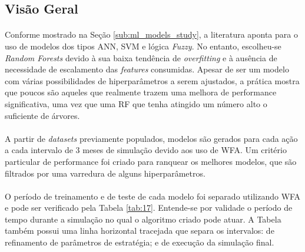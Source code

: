 \FloatBarrier
\subsection{Visão Geral}

\paragraph{} Conforme mostrado na Seção \ref{sub:ml_models_study}, a literatura aponta para o uso de modelos dos tipos ANN, SVM e lógica \textit{Fuzzy}. No entanto, escolheu-se \textit{Random Forests} devido à sua baixa tendência de \textit{overfitting} e à ausência de necessidade de escalamento das \textit{features} consumidas. Apesar de ser um modelo com várias possibilidades de hiperparâmetros a serem ajustados, a prática mostra que poucos são aqueles que realmente trazem uma melhora de performance significativa, uma vez que uma RF que tenha atingido um número alto o suficiente de árvores.

\paragraph{} A partir de \textit{datasets} previamente populados, modelos são gerados para cada ação a cada intervalo de 3 meses de simulação devido aos uso de WFA. Um critério particular de performance foi criado para ranquear os melhores modelos, que são filtrados por uma varredura de alguns hiperparâmetros.

\paragraph{} O período de treinamento e de teste de cada modelo foi separado utilizando WFA e pode ser verificado pela Tabela \ref{tab:17}. Entende-se por validade o período de tempo durante a simulação no qual o algoritmo criado pode atuar. A Tabela também possui uma linha horizontal tracejada que separa os intervalos: de refinamento de parâmetros de estratégia; e de execução da simulação final.

